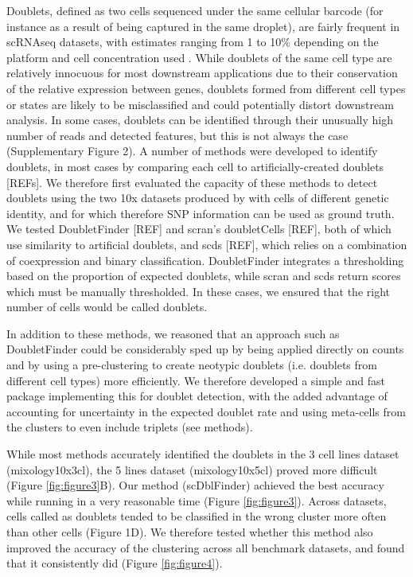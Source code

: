 \documentclass{bmcart}
\begin{document}
Doublets, defined as two cells sequenced under the same cellular barcode (for instance as a result of being captured in the same droplet), are fairly frequent in scRNAseq datasets, with estimates ranging from 1 to 10\% depending on the platform and cell concentration used \citep{bloomEstimating2018,kangMultiplexedDemuxlet2018}. While doublets of the same cell type are relatively innocuous for most downstream applications due to their conservation of the relative expression between genes, doublets formed from different cell types or states are likely to be misclassified and could potentially distort downstream analysis. In some cases, doublets can be identified through their unusually high number of reads and detected features, but this is not always the case (Supplementary Figure 2). A number of methods were developed to identify doublets, in most cases by comparing each cell to artificially-created doublets [REFs]. We therefore first evaluated the capacity of these methods to detect doublets using the two 10x datasets produced by \citep{tianMixology2018} with cells of different genetic identity, and for which therefore SNP information can be used as ground truth. We tested DoubletFinder [REF] and scran's doubletCells [REF], both of which use similarity to artificial doublets, and scds [REF], which relies on a combination of coexpression and binary classification. DoubletFinder integrates a thresholding based on the proportion of expected doublets, while scran and scds return scores which must be manually thresholded. In these cases, we ensured that the right number of cells would be called doublets.

In addition to these methods, we reasoned that an approach such as DoubletFinder could be considerably sped up by being applied directly on counts and by using a pre-clustering to create neotypic doublets (i.e. doublets from different cell types) more efficiently. We therefore developed a simple and fast package implementing this for doublet detection, with the added advantage of accounting for uncertainty in the expected doublet rate and using meta-cells from the clusters to even include triplets (see methods).

While most methods accurately identified the doublets in the 3 cell lines dataset (mixology10x3cl), the 5 lines dataset (mixology10x5cl) proved more difficult (Figure \ref{fig:figure3}B). Our method (scDblFinder) achieved the best accuracy while running in a very reasonable time (Figure \ref{fig:figure3}). Across datasets, cells called as doublets tended to be classified in the wrong cluster more often than other cells (Figure 1D). We therefore tested whether this method also improved the accuracy of the clustering across all benchmark datasets, and found that it consistently did (Figure \ref{fig:figure4}).
\end{document}
